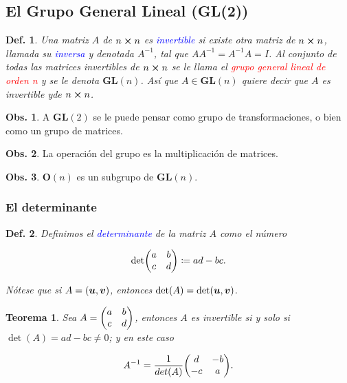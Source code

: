 \documentclass{article}
\theoremstyle{definicion}
\newtheorem{definicion}{Def.}
\theoremstyle{definition}             %
\theoremstyle{definition}             %
\theoremstyle{definition}
\theoremstyle{definition}
\theoremstyle{observacion}
\newtheorem{obs}{Obs.}
\theoremstyle{definition}
\theoremstyle{plain}
\newtheorem{theorem}{Teorema}
\theoremstyle{definition}
\theoremstyle{afirmacion}
\theoremstyle{notation}
\theoremstyle{definition}
\begin{document}
    \subsection{El Grupo General Lineal (GL(2))}

    \begin{definicion}
        Una matriz \(A\) de \(n \cross n\) es \textcolor{blue}{invertible} si existe otra matriz de \(n \cross n\), llamada su \textcolor{blue}{inversa} y denotada \(A^{-1}\), tal que \(A A^{-1} = A^{-1}A = I\). Al conjunto de todas las matrices invertibles de \(n \cross n\) se le llama el \textcolor{red}{grupo general lineal de orden n} y se le denota \(\bm{GL}(n)\). Así que \(A \in \bm{GL}(n)\) quiere decir que \(A\) es invertible yde \(n \cross n\).
    \end{definicion}

    \begin{obs}
        A \(\bm{GL}(2)\) se le puede pensar como grupo de transformaciones, o bien como un grupo de matrices.
    \end{obs}
    \begin{obs}
        La operación del grupo es la multiplicación de matrices.
    \end{obs}
    \begin{obs}
        \(\bm{O}(n)\) es un subgrupo de \(\bm{GL}(n)\).
    \end{obs}

    \subsubsection{El determinante}

    \begin{definicion}
        Definimos el \textcolor{blue}{determinante} de la matriz \(A\) como el número

        \begin{equation*}
            \det(
                \mqty{
                    a & b \\
                    c & d
                }
            ) \coloneq ad - bc.
        \end{equation*}

        Nótese que si \(A = (\vb*{u}, \vb*{v})\), entonces \(\det(A) = \det(\vb*{u}, \vb*{v})\).
    \end{definicion}

    \begin{theorem}
        Sea \(A = \mqty(a & b \\ c & d)\), entonces \(A\) es invertible si y solo si \(\det(A) = ad - bc \neq 0\); y en este caso

        \begin{equation*}
            A^{-1} = \dfrac{1}{det(A)} \mqty(
                d & -b \\
                -c & a
            ).
        \end{equation*}
    \end{theorem}
\end{document}
